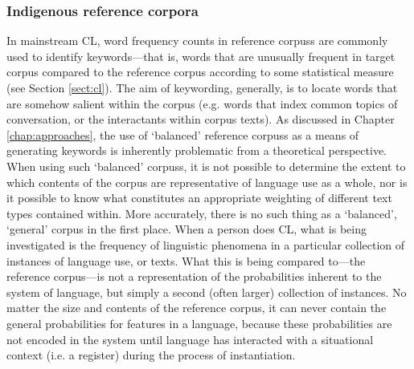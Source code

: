 


\subsubsection{Indigenous reference corpora}

In mainstream \gls{CL}, word frequency counts in reference \glspl{corpus} are commonly used to identify keywords---that is, words that are unusually frequent in target corpus compared to the reference corpus according to some statistical measure (see Section \ref{sect:cl}). The aim of keywording, generally, is to locate words that are somehow salient within the corpus (e.g. words that index common topics of conversation, or the interactants within \gls{corpus} texts). As discussed in Chapter \ref{chap:approaches}, the use of `balanced' reference \glspl{corpus} as a means of generating keywords is inherently problematic from a theoretical perspective. When using such `balanced' \glspl{corpus}, it is not possible to determine the extent to which contents of the \gls{corpus} are representative of language use as a whole, nor is it possible to know what constitutes an appropriate weighting of different text types contained within. More accurately, there is no such thing as a `balanced', `general' corpus in the first place. When a person does \gls{CL}, what is being investigated is the frequency of linguistic phenomena in a particular collection of instances of language use, or texts. What this is being compared to---the reference corpus---is not a representation of the probabilities inherent to the system of language, but simply a second (often larger) collection of instances. No matter the size and contents of the reference \gls{corpus}, it can never contain the general probabilities for features in a language, because these probabilities are not encoded in the system until language has interacted with a situational context (i.e. a register) during the process of instantiation.

